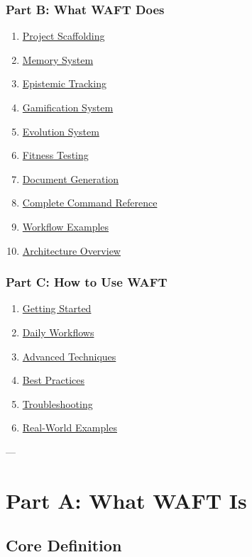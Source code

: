\documentclass{article}
\begin{document}
\subsubsection{Part B: What WAFT Does}
\begin{enumerate}
\item \href{#project-scaffolding}{Project Scaffolding}
\item \href{#memory-system}{Memory System}
\item \href{#epistemic-tracking}{Epistemic Tracking}
\item \href{#gamification-system}{Gamification System}
\item \href{#evolution-system}{Evolution System}
\item \href{#fitness-testing}{Fitness Testing}
\item \href{#document-generation}{Document Generation}
\item \href{#complete-command-reference}{Complete Command Reference}
\item \href{#workflow-examples}{Workflow Examples}
\item \href{#architecture-overview}{Architecture Overview}
\end{enumerate}

\subsubsection{Part C: How to Use WAFT}
\begin{enumerate}
\item \href{#getting-started}{Getting Started}
\item \href{#daily-workflows}{Daily Workflows}
\item \href{#advanced-techniques}{Advanced Techniques}
\item \href{#best-practices}{Best Practices}
\item \href{#troubleshooting}{Troubleshooting}
\item \href{#real-world-examples}{Real-World Examples}
\end{enumerate}

---

\section{Part A: What WAFT Is}

\subsection{Core Definition}
\end{document}

